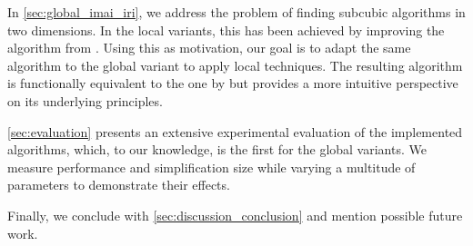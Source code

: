 In \cref{sec:global_imai_iri}, we address the problem of finding subcubic algorithms in two dimensions. In the local variants, this has been achieved by improving the algorithm from \citeauthor{computational_geometric_methods_for_polygonal_approximations_of_a_curve}. Using this as motivation, our goal is to adapt the same algorithm to the global variant to apply local techniques. The resulting algorithm is functionally equivalent to the one by \citeauthor{global_curve_simplification} but provides a more intuitive perspective on its underlying principles.

\cref{sec:evaluation} presents an extensive experimental evaluation of the implemented algorithms, which, to our knowledge, is the first for the global variants. We measure performance and simplification size while varying a multitude of parameters to demonstrate their effects.

Finally, we conclude with \cref{sec:discussion_conclusion} and mention possible future work.
 
